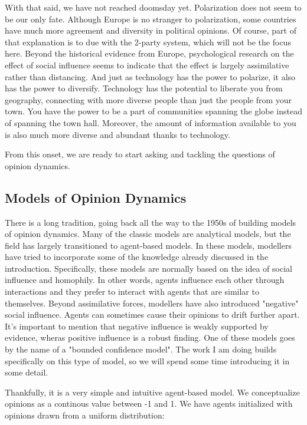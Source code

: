 \documentclass[9pt,twocolumn,twoside]{ilcss}
\begin{document}
With that said, we have not reached doomsday yet. Polarization does not seem to be our only fate.
Although Europe is no stranger to polarization, some countries have much more agreement and diversity in political opinions. 
Of course, part of that explanation is to due with the 2-party system, which will not be the focus here. 
Beyond the historical evidence from Europe, psychological research on the effect of social influence seems to indicate that the effect is largely assimilative rather than distancing.
And just as technology has the power to polarize, it also has the power to diversify. 
Technology has the potential to liberate you from geography, connecting with more diverse people than just the people from your town. 
You have the power to be a part of communities spanning the globe instead of spanning the town hall. 
Moreover, the amount of information available to you is also much more diverse and abundant thanks to technology. 

From this onset, we are ready to start asking and tackling the questions of opinion dynamics. 

\subsection{Models of Opinion Dynamics}
There is a long tradition, going back all the way to the 1950s of building models of opinion dynamics.
Many of the classic models are analytical models, but the field has largely transitioned to agent-based models.
In these models, modellers have tried to incorporate some of the knowledge already discussed in the introduction. 
Specifically, these models are normally based on the idea of social influence and homophily. 
In other words, agents influence each other through interactions and they prefer to interact with agents that are similar to themselves. 
Beyond assimilative forces, modellers have also introduced "negative" social influence. Agents can sometimes cause their opinions to drift further apart. It's important to mention that negative influence is weakly supported by evidence, wheras positive influence is a robust finding. 
One of these models goes by the name of a "bounded confidence model". The work I am doing builds specifically on this type of model, so we will spend some time introducing it in some detail. 

Thankfully, it is a very simple and intuitive agent-based model. We conceptualize opinions as a continous value between -1 and 1. We have agents initialized with opinions drawn from a uniform distribution:
\end{document}
